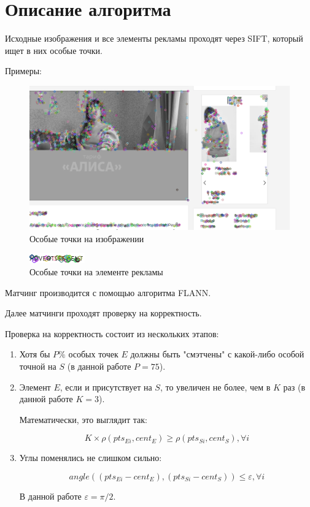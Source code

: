 \documentclass[a4paper,12pt,preview]{report} %
\begin{document}
	
	\section{Описание алгоритма}
	
	Исходные изображения и все элементы рекламы проходят через SIFT, который ищет в них особые точки.
	
	Примеры:
	
	\begin{figure}[H]
		\centering\includegraphics[scale=0.5]{page2.PNG}
		\caption{Особые точки на изображении}
		\label{fig:page2}
	\end{figure}
	
	\begin{figure}[H]
		\centering\includegraphics[scale=2]{elemmmm.PNG}
		\caption{Особые точки на элементе рекламы}
		\label{fig:elemmmm}
	\end{figure}
	
	
	
	Матчинг производится с помощью алгоритма FLANN.
	
	Далее матчинги проходят проверку на корректность.
	
	
	Проверка на корректность состоит из нескольких этапов:
	\begin{enumerate}
		\item Хотя бы $P\%$ особых точек $E$ должны быть "смэтчены" с какой-либо особой точной на $S$ (в данной работе $P = 75$).
		
		\item Элемент $E$, если и присутствует на $S$, то увеличен не более, чем в $K$ раз (в данной работе $K = 3$).
		
		Математически, это выглядит так:
		
		\begin{equation}
			K \times \rho(pts_{Ei}, cent_E) \geq \rho(pts_{Si}, cent_S), \forall i
		\end{equation}
		
		\item  Углы поменялись не слишком сильно:
		
		\begin{equation}
		angle((pts_{Ei} - cent_E), (pts_{Si} - cent_S)) \leq \varepsilon, \forall i
		\end{equation}
		
		В данной работе $\varepsilon = \pi / 2$.
		
	\end{enumerate}
\end{document}
